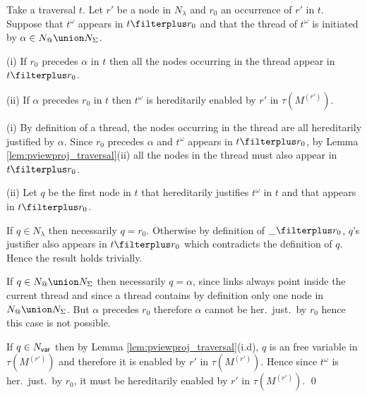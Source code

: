 \begin{lemma}
\label{lem:thread_projplus} Take a traversal $t$.  Let $r'$ be a
node in $N_\lambda$ and $r_0$ an occurrence of $r'$ in $t$. Suppose
that $t^\omega$ appears in $t\filterplus r_0$ and that the thread of
$t^\omega$ is initiated by $\alpha \in N_@ \union N_\Sigma$.

(i) If $r_0$ precedes $\alpha$ in $t$ then all the nodes occurring in the thread appear in $t\filterplus r_0$.

(ii) If $\alpha$ precedes $r_0$ in $t$ then
    $t^\omega$ is hereditarily enabled by $r'$ in $\tau(M^{(r')})$.
\end{lemma}
\proof
(i) By definition of a thread, the nodes occurring in the thread
are all hereditarily justified by $\alpha$.
Since $r_0$ precedes $\alpha$ and $t^\omega$ appears in $t\filterplus r_0$, by Lemma \ref{lem:pviewproj_traversal}(ii) all the nodes in the thread must also appear in $t \filterplus r_0$.

(ii)
Let $q$ be the first node in $t$ that hereditarily justifies
$t^\omega$ in $t$ and that appears in $t\filterplus r_0$.


If $q \in N_\lambda$ then necessarily $q = r_0$. Otherwise by definition of $\_\filterplus r_0$,
$q$'s justifier also appears in $t\filterplus r_0$ which contradicts
the definition of $q$. Hence the result holds trivially.

If $q\in N_@\union N_\Sigma$ then necessarily $q=\alpha$, since
links always point inside the current thread and since a thread contains by definition only one node in $N_@\union N_\Sigma$. But $\alpha$ precedes $r_0$ therefore $\alpha$ cannot be her.\ just.\ by $r_0$ hence this case is not possible.

If $q \in N_{\sf var}$ then by Lemma \ref{lem:pviewproj_traversal}(i.d),
$q$ is an free variable in $\tau(M^{(r')})$ and therefore
it is enabled by $r'$ in $\tau(M^{(r')})$. Hence since $t^\omega$ is her.\ just.\ by $r_0$, it must be hereditarily enabled
by $r'$ in $\tau(M^{(r')})$. \qed

